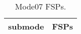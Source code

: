 \begin{table}[h!]
\begin{center}
\begin{tabular}{cl}
\hline
submode& FSPs\\
\hline
\hline
\end{tabular}
\label{tab:Mode07FSPs}
\caption{Mode07 FSPs.}
\end{center}
\end{table}
